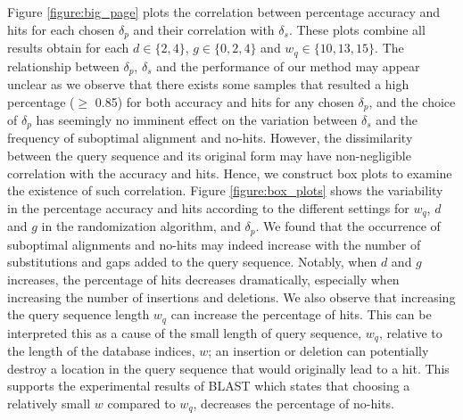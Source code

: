 \documentclass{article}
\begin{document}
Figure \ref{figure:big_page} plots the correlation between percentage accuracy and hits for each chosen $\delta_p$ and their correlation with $\delta_s$. These plots combine all results obtain for each $d \in \{2, 4\}$, $g \in \{0, 2, 4\}$ and $w_q \in \{10, 13, 15\}$. The relationship between $\delta_p$, $\delta_s$ and the performance of our method may appear unclear as we observe that there exists some samples that resulted a high percentage ($\ge$ 0.85) for both accuracy and hits for any chosen $\delta_p$, and the choice of $\delta_p$ has seemingly no imminent effect on the variation between $\delta_s$ and the frequency of suboptimal alignment and no-hits. However, the dissimilarity between the query sequence and its original form may have non-negligible correlation with the accuracy and hits. Hence, we construct box plots to examine the existence of such correlation. Figure \ref{figure:box_plots} shows the variability in the percentage accuracy and hits according to the different settings for $w_q$,  $d$ and $g$  in the randomization algorithm, and $\delta_p$. We found that the occurrence of suboptimal alignments and no-hits may indeed increase with the number of substitutions and gaps added to the query sequence. Notably, when $d$ and $g$ increases, the percentage of hits decreases dramatically, especially when increasing the number of insertions and deletions. We also observe that increasing the query sequence length $w_q$ can increase the percentage of hits. This can be interpreted this as a cause of the small length of query sequence, $w_q$, relative to the length of the database indices, $w$; an insertion or deletion can potentially destroy a location in the query sequence that would originally lead to a hit. This supports the experimental results of BLAST which states that choosing a relatively small $w$ compared to $w_q$, decreases the percentage of no-hits. \cite{blast} 
\end{document}
